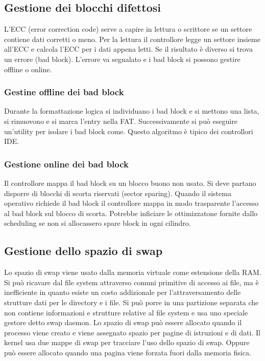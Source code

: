 \subsection{Gestione dei blocchi difettosi}
L'ECC (error correction code) serve a capire in lettura o scrittore se un settore contiene dati corretti o meno. Per la lettura il controllore legge un settore insieme all'ECC e calcola
l'ECC per i dati appena letti. Se il risultato \`e diverso si trova un errore (bad block). L'errore va segnalato e i bad block si possono gestire offline o online. 
\subsubsection{Gestine offline dei bad block}
Durante la formattazione logica si individuano i bad block e si mettono una lista, si rimuovono e si marca l'entry nella FAT. Successivamente si pu\`o eseguire un'utility per isolare i 
bad block come. Questo algoritmo \`e tipico dei controllori IDE. 
\subsubsection{Gestione online dei bad block}
Il controllore mappa il bad block su un blocco buono non usato. Si deve partano disporre di blocchi di scorta riservati (sector sparing). Quando il sistema operativo richiede il bad 
block il controllore mappa in modo trasparente l'accesso al bad block sul blocco di scorta. Potrebbe inficiare le ottimizzatone fornite dallo scheduling se non si allocassero spare
block in ogni cilindro. 
\subsection{Gestione dello spazio di swap}
Lo spazio di swap viene usato dalla memoria virtuale come estensione della RAM. Si pu\`o ricavare dal file system attraverso comuni primitive di accesso ai file, ma \`e inefficiente in
quanto esiste un costo addizionale per l'attraversamento delle strutture dati per le directory e i file. Si pu\`o porre in una partizione separata che non contiene informazioni e 
strutture relative al file system e usa uno speciale gestore detto swap daemon. Lo spazio di swap pu\`o essere allocato quando il processo viene creato e viene assegnato spazio per 
pagine di istruzioni e di dati. Il kernel usa due mappe di swap per tracciare l'uso dello spazio di swap. Oppure pu\`o essere allocato quando una pagina viene forzata fuori dalla memoria
fisica. 
